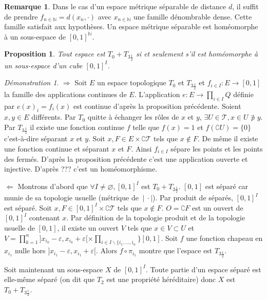 \documentclass[a4paper, 11pt, french]{book}
\newenvironment{itemise}{\itemize}{\enditemize}
\theoremstyle{plain} %
\newtheorem{proposition}{Proposition}
\theoremstyle{definition} %
\newtheorem{remarque}{Remarque}
\theoremstyle{remark} %
\newtheorem*{demonstration}{Démonstration}
\renewcommand{\setminus}{\backslash}
\newcommand{\1}{\mathds{1}}
\newcommand\vide{\varnothing}
\newcommand{\N}{\mathbb{N}}
\newcommand{\scr}[1]{\mathscr{#1}}
\newcommand\ens[2]{\{#1 \ |\ #2\}}
\begin{document}
\begin{remarque}
	Dans le cas d'un espace métrique séparable de distance $d$, il suffit de prendre $f_{n\in\N}=d(x_n, \cdot)$ avec $x_{n\in\N}$ une famille dénombrable dense.
	Cette famille satisfait aux hypothèses.
	Un espace métrique séparable est homéomorphe à un sous-espace de $[0, 1]^\N$.
\end{remarque}

\begin{proposition}
	Tout espace est $T_0+T_{3\frac{1}{2}}$ si et seulement s'il est homéomorphe à un sous-espace d'un cube $[0, 1]^I$.
\end{proposition}

\begin{demonstration}
	\begin{itemise}
		\item[$\Rightarrow$] Soit $E$ un espace topologique $T_0$ et $T_{3\frac{1}{2}}$ et $f_{i\in I}:E\rightarrow [0, 1]$ la famille des applications continues de $E$.
		L'application $e:E\rightarrow \prod_{i\in I}Q$ définie par $e(x)_i=f_i(x)$ est continue d'après la proposition précédente.
		Soient $x, y\in E$ différents.
		Par $T_0$ quitte à échanger les rôles de $x$ et $y$, $\exists U\in\scr{T}, x\in U\not\ni y$.
		Par $T_{3\frac{1}{2}}$ il existe une fonction continue $f$ telle que $f(x)=1$ et $f(\complement U)=\ens{0\}$ c'est-à-dire séparant $x$ et $y$.
		Soit $x, F\in E\times\complement\scr{T}$ tels que $x\notin F$.
		De même il existe une fonction continue et séparant $x$ et $F$.
		Ainsi $f_{i\in I}$ sépare les points et les points des fermés.
		D'après la proposition précédente c'est une application ouverte et injective.
		D'après {\color{red} ???} c'est un homéomorphisme.
		\item[$\Leftarrow$] Montrons d'abord que $\forall I\neq\vide, [0, 1]^I$ est $T_0+T_{3\frac{1}{2}}$.
		$[0, 1]$ est séparé car munie de sa topologie usuelle (métrique de $}{\cdot|$).
		Par produit de séparés, $[0, 1]^I$ est séparé.
		Soit $x, F\in[0, 1]^I\times\complement\scr{T}$ tels que $x\notin F$.
		$O=\complement F$ est un ouvert de $[0, 1]^I$ contenant $x$.
		Par définition de la topologie produit et de la topologie usuelle de $[0, 1]$, il existe un ouvert $V$ tels que $x\in V\subset U$ et $V=\prod_{k=1}^n]x_{i_k}-\varepsilon, x_{i_k}+\varepsilon[\times\prod_{i\in I\setminus\{i_1, ..., i_n}}[0, 1]$.
					Soit $f$ une fonction chapeau en $x_{i_1}$ nulle hors $]x_{i_1}-\varepsilon, x_{i_1}+\varepsilon[$.
		Alors $f\circ\pi_{i_1}$ montre que l'espace est $T_{3\frac{1}{2}}$.

		Soit maintenant un sous-espace $X$ de $[0, 1]^I$.
		Toute partie d'un espace séparé est elle-même séparé (on dit que $T_2$ est une propriété héréditaire) donc $X$ est $T_0+T_{3\frac{1}{2}}$.
	\end{itemise}
\end{demonstration}
\end{document}
